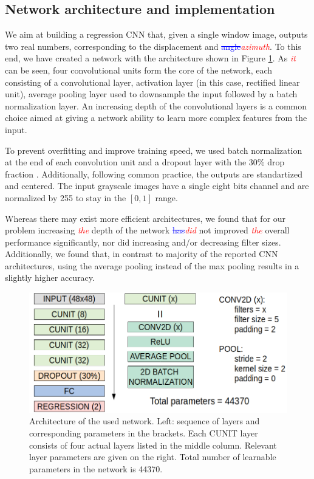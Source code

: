 \documentclass{svjour3}                     %
\newcommand{\new}[1]{\textit{\textcolor{red}{#1}}}
\newcommand{\old}[1]{\textcolor{blue}{\sout{#1}}}
\begin{document}
\subsection{Network architecture and implementation}

We aim at building a regression CNN that, given a single window image, outputs two real numbers, corresponding to the displacement and \old{angle}\new{azimuth}. To this end, we have created a network with the architecture shown in Figure \ref{fig:figcnn}. As \new{it} can be seen, four convolutional units form the core of the network, each consisting of a convolutional layer, activation layer (in this case, rectified linear unit), average pooling layer used to downsample the input followed by a batch normalization layer. An increasing depth of the convolutional layers is a common choice aimed at giving a network ability to learn more complex features from the input. 

To prevent overfitting and improve training speed, we used batch normalization at the end of each convolution unit \cite{ioffe2015batch} and a dropout layer with the 30\% drop fraction \cite{srivastava2014dropout}. Additionally, following common practice, the outputs are standartized and centered. The input grayscale images have a single eight bits channel and are normalized by 255 to stay in the $[0, 1]$ range.

Whereas there may exist more efficient architectures, we found that for our problem increasing \new{the} depth of the network \old{has}\new{did} not improved \new{the} overall performance significantly, nor did increasing and/or decreasing filter sizes. Additionally, we found that, in contrast to majority of the reported CNN architectures, using the average pooling instead of the max pooling results in a slightly higher accuracy.

\begin{figure}
\includegraphics[width=\textwidth]{figs/figure_CNN.png}
\caption{Architecture of the used network. Left: sequence of layers and corresponding parameters in the brackets. Each CUNIT layer consists of four actual layers listed in the middle column. Relevant layer parameters are given on the right. Total number of learnable parameters in the network is 44370.}
\label{fig:figcnn}
\end{figure}
\end{document}
